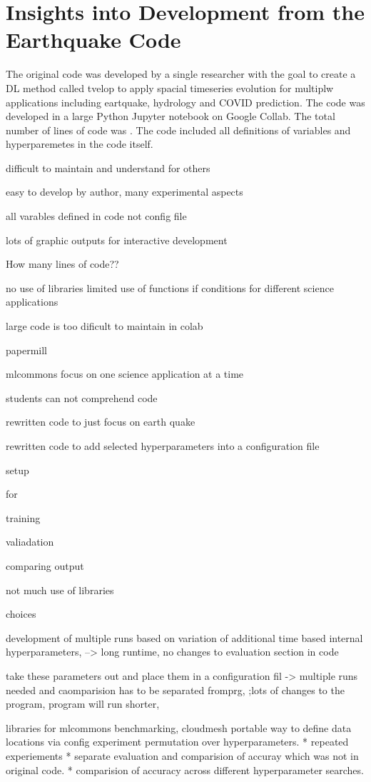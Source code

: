 \section{Insights into Development from the Earthquake Code}

The original code was developed by a single researcher with the goal to create a DL method called tvelop to apply spacial timeseries evolution for multiplw applications including eartquake, hydrology and COVID prediction. The code was developed in a large Python Jupyter notebook on Google Collab. The total number of lines of code was . The code included all definitions of variables and hyperparemetes in the code itself.


difficult to maintain and understand for others

easy to develop by author, many experimental aspects

all varables defined in code not config file

lots of graphic outputs for interactive development

How many lines of code??


no use of libraries
limited use of functions
if conditions for different science applications


large code is too dificult to maintain in colab

papermill

mlcommons focus on one science application at a time

students can not comprehend code

rewritten code to just focus on earth quake

rewritten code to add selected hyperparameters into a configuration file


setup

for

training

valiadation 

comparing output

not much use of libraries

choices

development of multiple runs based on variation of additional time based internal hyperparameters,
--> long runtime, no changes to evaluation section in code

take these parameters out and place them in a configuration fil
->   multiple runs needed and caomparision has to be separated fromprg, ;lots of changes to the program, program will run shorter,


libraries for mlcommons benchmarking, cloudmesh
portable way to define data locations via config
experiment permutation over hyperparameters.
* repeated experiements
* separate evaluation and comparision of accuray which was not in original code.
* comparision of accuracy across different hyperparameter searches.